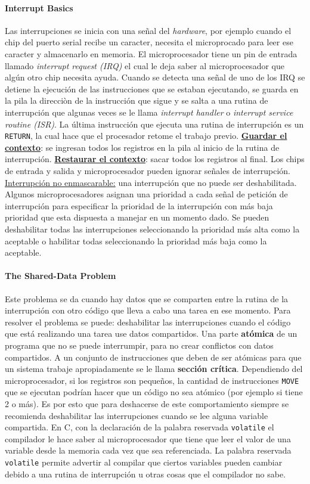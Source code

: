 \paragraph{\textnormal{\textbf{Interrupt Basics}}}
Las interrupciones se inicia con una señal del \textit{hardware}, por ejemplo cuando el chip del puerto serial recibe un caracter, necesita el microprocado para leer ese caracter y almacenarlo en memoria. El microprocesador tiene un pin de entrada llamado \textit{interrupt request (IRQ)} el cual le deja saber al microprocesador que algún otro chip necesita ayuda. Cuando se detecta una señal de uno de los IRQ se detiene la ejecución de las instrucciones que se estaban ejecutando, se guarda en la pila la direcciòn de la instrucción que sigue y se salta a una rutina de interrupción que algunas veces se le llama \textit{interrupt handler} o \textit{interrupt service routine (ISR)}. La última instrucción que ejecuta una rutina de interrupción es un \texttt{RETURN}, la cual hace que el procesador retome el trabajo previo. \underline{\textbf{Guardar el contexto}}: se ingresan todos los registros en la pila al inicio de la rutina de interrupción. \underline{\textbf{Restaurar el contexto}}: sacar todos los registros al final. Los chips de entrada y salida y microprocesador pueden ignorar señales de interrupción. \underline{Interrupción no enmascarable:} una interrupción que no puede ser deshabilitada. Algunos microprocesadores asignan una prioridad a cada señal de petición de interrupción para especificar la prioridad de la interrupción con más baja prioridad que esta dispuesta a manejar en un momento dado. Se pueden deshabilitar todas las interrupciones seleccionando la prioridad más alta como la aceptable o habilitar todas seleccionando la prioridad más baja como la aceptable. 

\paragraph{\textnormal{\textbf{The Shared-Data Problem}}}
Este problema se da cuando hay datos que se comparten entre la rutina de la interrupción con otro código que lleva a cabo una tarea en ese momento. Para resolver el problema se puede: deshabilitar las interrupciones cuando el código que está realizando una tarea use datos compartidos. Una parte \textbf{atómica} de un programa que no se puede interrumpir, para no crear conflictos con datos compartidos. A un conjunto de instrucciones que deben de ser atómicas para que un sistema trabaje apropiadamente se le llama \textbf{sección crítica}. Dependiendo del microprocesador, si los registros son pequeños, la cantidad de instrucciones \texttt{MOVE} que se ejecutan podrían hacer que un código no sea atómico (por ejemplo si tiene 2 o más). Es por esto que para deshacerse de este comportamiento siempre se recomienda deshabilitar las interrupciones cuando se lee alguna variable compartida. En C, con la declaración de la palabra reservada \texttt{volatile} el compilador le hace saber al microprocesador que tiene que leer el valor de una variable desde la memoria cada vez que sea referenciada. La palabra reservada \texttt{volatile} permite advertir al compilar que ciertos variables pueden cambiar debido a una rutina de interrupción u otras cosas que el compilador no sabe. 

